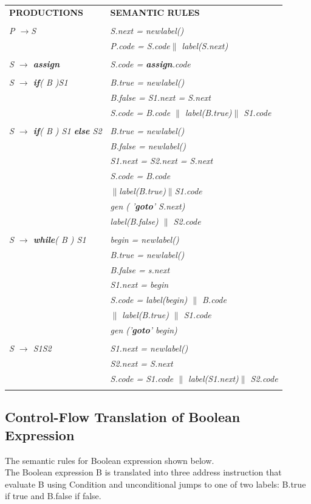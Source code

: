 \documentclass[12pt, oneside, a4paper]{article}
\begin{document}
\begin{tabular}{ll}
\textbf{PRODUCTIONS}& \textbf{SEMANTIC RULES}\\\\
\emph{P $\rightarrow$S }& \emph{S.next = newlabel()}\\
& \emph{P.code = S.code$\|$ label(S.next)}\\\\
\emph{S $\rightarrow$ \textbf{assign}}& \emph{S.code = \textbf{assign}.code}\\\\
\emph{S $\rightarrow$ \textbf{if}( B )S1}& \emph{B.true = newlabel()}\\
& \emph{B.false = S1.next = S.next}\\
& \emph{S.code = B.code $\|$ label(B.true)$\|$ S1.code}\\\\
\emph{S $\rightarrow$ \textbf{if}( B ) S1 \textbf{else} S2}& \emph{B.true = newlabel()}\\
&\emph{B.false = newlabel()}\\
&\emph{S1.next = S2.next = S.next}\\
&\emph{S.code = B.code}\\
& \emph{$\|$label(B.true)$\|$S1.code  }\\
&\emph{gen ( '\textbf{goto}' S.next)}\\
& \emph{label(B.false) $\|$ S2.code}\\\\
\emph{S $\rightarrow$ \textbf{while}( B ) S1}& \emph{begin = newlabel()}\\
& \emph{B.true = newlabel()}\\
&\emph{B.false = s.next}\\
&\emph{S1.next = begin}\\
&\emph{S.code = label(begin) $\|$ B.code}\\
&\emph{$\|$ label(B.true) $\|$ S1.code}\\
&\emph{gen ('\textbf{goto}' begin)}\\\\
\emph{S $\rightarrow$ S1S2}& \emph{S1.next = newlabel()}\\
&\emph{S2.next = S.next}\\
&\emph{S.code = S1.code $\|$ label(S1.next)$\|$ S2.code}\\\\
\end{tabular}

\subsection{Control-Flow Translation of Boolean Expression}
The semantic rules for Boolean expression shown below.\\
The Boolean expression B is translated into three address instruction that evaluate B using Condition and unconditional jumps to one of two labels: B.true if true and B.false if false.\\
\end{document}
